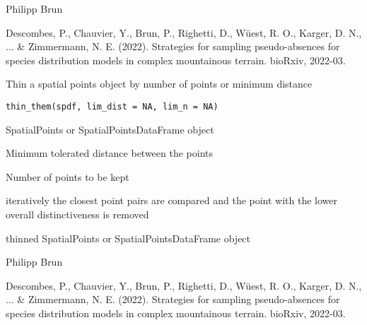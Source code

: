\documentclass[a4paper]{book}
\begin{document}
%
\begin{Author}\relax
Philipp Brun
\end{Author}
%
\begin{References}\relax
Descombes, P., Chauvier, Y., Brun, P., Righetti, D., Wüest, R. O., Karger, D. N., ... \&
Zimmermann, N. E. (2022). Strategies for sampling pseudo-absences for species distribution
models in complex mountainous terrain. bioRxiv, 2022-03.
\end{References}
%
\begin{Description}\relax
Thin a spatial points object by number of points or minimum distance
\end{Description}
%
\begin{Usage}
\begin{verbatim}
thin_them(spdf, lim_dist = NA, lim_n = NA)
\end{verbatim}
\end{Usage}
%
\begin{Arguments}
\begin{ldescription}
\item[\code{spdf}] SpatialPoints or SpatialPointsDataFrame object

\item[\code{lim\_dist}] Minimum tolerated distance between the points

\item[\code{lim\_n}] Number of points to be kept
\end{ldescription}
\end{Arguments}
%
\begin{Details}\relax
iteratively the closest point pairs are compared and the
point with the lower overall distinctiveness is removed
\end{Details}
%
\begin{Value}
thinned SpatialPoints or SpatialPointsDataFrame object
\end{Value}
%
\begin{Author}\relax
Philipp Brun
\end{Author}
%
\begin{References}\relax
Descombes, P., Chauvier, Y., Brun, P., Righetti, D., Wüest, R. O., Karger, D. N., ... \&
Zimmermann, N. E. (2022). Strategies for sampling pseudo-absences for species distribution
models in complex mountainous terrain. bioRxiv, 2022-03.
\end{References}
\end{document}
